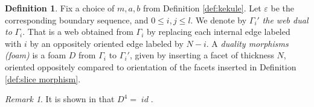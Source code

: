 \documentclass[12pt]{amsart}
\theoremstyle{definition}
\newtheorem{definition}[theorem]{Definition}
\theoremstyle{remark}
\newtheorem{remark}[theorem]{Remark}
\numberwithin{equation}{section}
\numberwithin{figure}{section}
\DeclareMathOperator{\idfoam}{\mathit{id}}
\begin{document}
\begin{definition}\label{def:duality morphism}
    Fix a choice of $m, a, b$ from Definition \ref{def:kekule}. Let $\varepsilon$ be the corresponding boundary sequence, and $0\leq i,j\leq l $. We denote by $\Gamma_i'$ \emph{the web dual to} $\Gamma_i$. That is a web obtained from $\Gamma_i$ by replacing each internal edge labeled with $i$ by an oppositely oriented edge labeled by $N -i$. A \emph{duality morphisms (foam)} is a foam $D$ from $\Gamma_i$ to $\Gamma_i'$, given by inserting a facet of thickness $N$, oriented oppositely compared to orientation of the facets inserted in Definition \ref{def:slice morphism}.
\end{definition}

\begin{remark}\label{rmk:D4 = id}
    It is shown in \cite[Lemma 3.21]{RW2020} that $D^4 = \idfoam$.
\end{remark}
\end{document}
